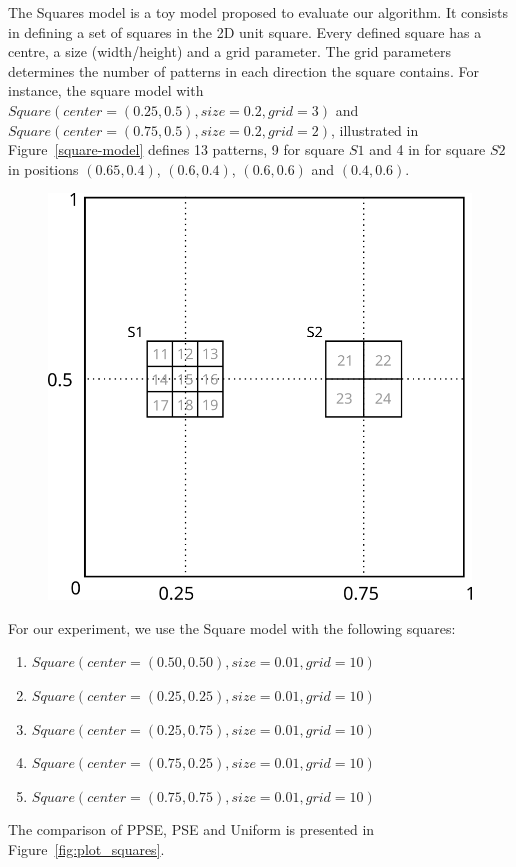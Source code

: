 \documentclass[10pt,letterpaper]{article}
\theoremstyle{definition}
\theoremstyle{remark}
\begin{document}
The Squares model is a toy model proposed to evaluate our algorithm.
It consists in defining a set of squares in the 2D unit square.
Every defined square has a centre, a size (width/height) and a grid parameter.
The grid parameters determines the number of patterns in each direction the square contains.
For instance, the square model with $Square(center=(0.25,0.5), size=0.2, grid=3)$ and $Square(center=(0.75,0.5), size=0.2, grid=2)$, illustrated in Figure~\ref{square-model} defines 13 patterns, 9 for square $S1$ and 4 in for square $S2$ in positions $(0.65,0.4)$, $(0.6,0.4)$, $(0.6,0.6)$ and $(0.4,0.6)$.


\begin{figure}
 \centering
  \includegraphics[width=0.7\linewidth ]{images/square.png}
\end{figure}



For our experiment, we use the Square model with the following squares:
\begin{enumerate}
  \item[] $Square(center=(0.50, 0.50), size=0.01, grid=10)$
  \item[] $Square(center=(0.25, 0.25), size=0.01, grid=10)$
  \item[] $Square(center=(0.25, 0.75), size=0.01, grid=10)$
  \item[] $Square(center=(0.75, 0.25), size=0.01, grid=10)$
  \item[] $Square(center=(0.75, 0.75), size=0.01, grid=10)$
\end{enumerate}
      
The comparison of PPSE, PSE and Uniform is presented in Figure~\ref{fig:plot_squares}.
\end{document}
